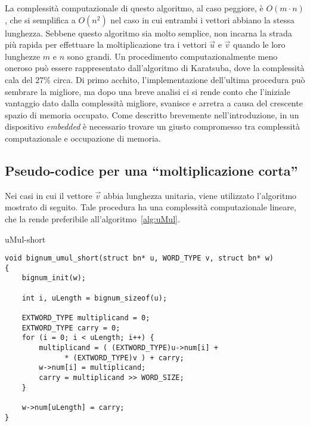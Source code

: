 La complessità computazionale di questo algoritmo, al caso peggiore, è $O(m \cdot n)$, che si semplifica a $O(n^2)$ nel caso in cui entrambi i vettori abbiano la stessa lunghezza. Sebbene questo algoritmo sia molto semplice, non incarna la strada più rapida per effettuare la moltiplicazione tra i vettori $\vec{u}$ e $\vec{v}$ quando le loro lunghezze $m$ e $n$ sono grandi. Un procedimento computazionalmente meno oneroso può essere rappresentato dall'algoritmo di Karatsuba, dove la complessità cala del $27\%$ circa. Di primo acchito, l'implementazione dell'ultima procedura può sembrare la migliore, ma dopo una breve analisi ci si rende conto che l'iniziale vantaggio dato dalla complessità migliore, svanisce e arretra a causa del crescente spazio di memoria occupato. Come descritto brevemente nell'introduzione, in un dispositivo \emph{embedded} è necessario trovare un giusto compromesso tra complessità computazionale e occupazione di memoria.

%
\subsection{Pseudo-codice per una ``moltiplicazione corta''}
%

Nei casi in cui il vettore $\vec{v}$ abbia lunghezza unitaria, viene utilizzato l'algoritmo mostrato di seguito. Tale procedura ha una complessità computazionale lineare, che la rende preferibile all'algoritmo~\ref{alg:uMul}.

\begin{algorithm}[H]
	\caption{uMul-short}
	\label{alg:uMul-short}
	\DontPrintSemicolon
\end{algorithm}

\begin{lstlisting}[basicstyle=\ttfamily\small, backgroundcolor=\color{bgCode}]
void bignum_umul_short(struct bn* u, WORD_TYPE v, struct bn* w)
{
    bignum_init(w);
    
    int i, uLength = bignum_sizeof(u);
    
    EXTWORD_TYPE multiplicand = 0;
    EXTWORD_TYPE carry = 0;
    for (i = 0; i < uLength; i++) {
        multiplicand = ( (EXTWORD_TYPE)u->num[i] +
              * (EXTWORD_TYPE)v ) + carry;
        w->num[i] = multiplicand;
        carry = multiplicand >> WORD_SIZE;
    }
    
    w->num[uLength] = carry;
}
\end{lstlisting}
\clearpage

